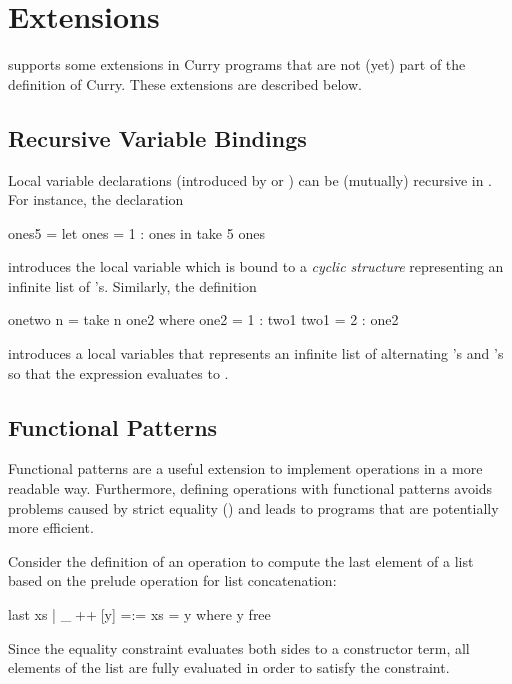 \section{Extensions}
\label{sec-extensions}

\CYS supports some extensions in Curry programs that are not (yet)
part of the definition of Curry. These extensions are described below.

\subsection{Recursive Variable Bindings}

Local variable declarations (introduced by 
or ) can be (mutually) recursive in \CYS.
For instance, the declaration
\begin{curry}
ones5 = let ones = 1 : ones
         in take 5 ones
\end{curry}
introduces the local variable  which is bound
to a \emph{cyclic structure}
representing an infinite list of 's.
Similarly, the definition
\begin{curry}
onetwo n = take n one2
 where
   one2 = 1 : two1
   two1 = 2 : one2
\end{curry}
introduces a local variables  that represents
an infinite list of alternating 's and 's
so that the expression  evaluates to \code{[1,2,1,2,1,2]}.


\subsection{Functional Patterns}

Functional patterns \cite{AntoyHanus05LOPSTR} are a useful extension
to implement operations in a more readable way. Furthermore,
defining operations with functional patterns avoids problems
caused by strict equality (\ccode{=:=}) and leads to programs
that are potentially more efficient.

Consider the definition of an operation to compute the last element
of a list  based on the prelude operation \ccode{++}
for list concatenation:
\begin{curry}
last xs | _$\;$++$\;$[y] =:= xs  = y   where y free
\end{curry}
Since the equality constraint \ccode{=:=} evaluates both sides
to a constructor term, all elements of the list  are
fully evaluated in order to satisfy the constraint.

